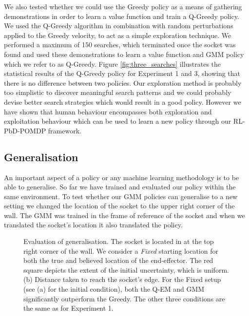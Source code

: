 We also tested whether we could use the Greedy policy as a means of gathering demonstrations in order to learn a value function and 
train a Q-Greedy policy. We used the Q-Greedy algorithm in combination with random perturbations applied to the Greedy velocity, to act as 
a simple exploration technique. We performed a maximum of 150 searches, which terminated once the socket was found and used these demonstrations to 
learn a value function and GMM policy which we refer to as Q-Greedy. Figure \ref{fig:three_searches} illustrates the statistical results 
of the Q-Greedy policy for Experiment 1 and 3, showing that there is no difference between two policies. 
Our exploration method is probably too simplistic to discover meaningful search patterns and we could probably devise better 
search strategies which would result in a good policy. However we have shown that human behaviour encompasses both
exploration and exploitation behaviour which can be used to learn a new policy through our RL-PbD-POMDP framework.

\subsection{Generalisation}

An important aspect of a policy or any machine learning methodology is to be able to generalise. So far we have trained and 
evaluated our policy within the same environment. To test whether our GMM policies can generalise to a new setting we changed 
the location of the socket to the upper right corner of the wall. The GMM was trained in the frame of reference of the socket and
when we translated the socket's location it also translated the policy. 

\begin{figure}
 \centering
    \caption{Evaluation of generalisation. The socket is located in at the top right corner of the wall. We consider a 
    \textit{Fixed} starting location for both the true and believed location of the end-effector. The red square depicts the 
    extent of the initial uncertainty, which is uniform. (b) Distance taken to reach the socket's edge. For the Fixed setup (see (a) for 
    the initial condition), both the Q-EM and GMM significantly outperform the Greedy. The other three conditions are the same as for 
    Experiment 1. }
    \label{fig:experiment5_traj}
\end{figure}

